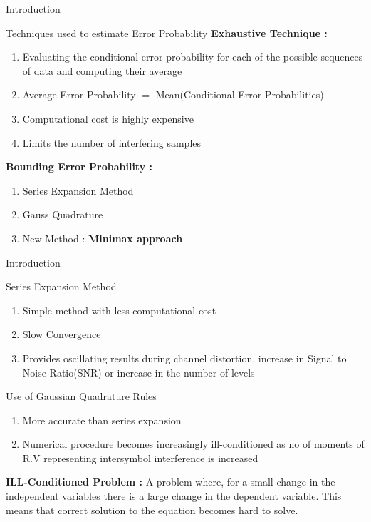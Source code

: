 \documentclass{beamer}
\begin{document}
\begin{frame}{Introduction}
\begin{block}{Techniques used to estimate Error Probability}
\textbf{Exhaustive Technique :}
\begin{enumerate}[]
\item Evaluating the conditional error probability for each of the possible sequences of data and computing their
      average
\item Average Error Probability $=$ Mean(Conditional Error Probabilities)  
\item Computational cost is highly expensive
\item Limits the number of interfering samples
\end{enumerate}
\textbf{Bounding Error Probability :}
\begin{enumerate}[]
\item Series Expansion Method
\item Gauss Quadrature  
\item New Method : \textbf{Minimax approach} 
\end{enumerate}
\end{block}
\end{frame}
\begin{frame}{Introduction}
\begin{block}{Series Expansion Method}
\begin{enumerate}[]
\item Simple method with less computational cost
\item Slow Convergence
\item Provides oscillating results during channel distortion, increase in Signal to Noise Ratio(SNR) or 
      increase in the number of levels 
\end{enumerate}
\end{block}
\begin{block}{Use of Gaussian Quadrature Rules}
\begin{enumerate}[]
\item More accurate than series expansion
\item Numerical procedure becomes increasingly ill-conditioned as no of moments of R.V representing
      intersymbol interference is increased
\end{enumerate}
\textbf{ILL-Conditioned Problem :} A problem where, for a small change in the independent variables there is a large
change in the dependent variable. 
This means that correct solution to the equation becomes hard to solve.
\end{block}
\end{frame}
\end{document}
